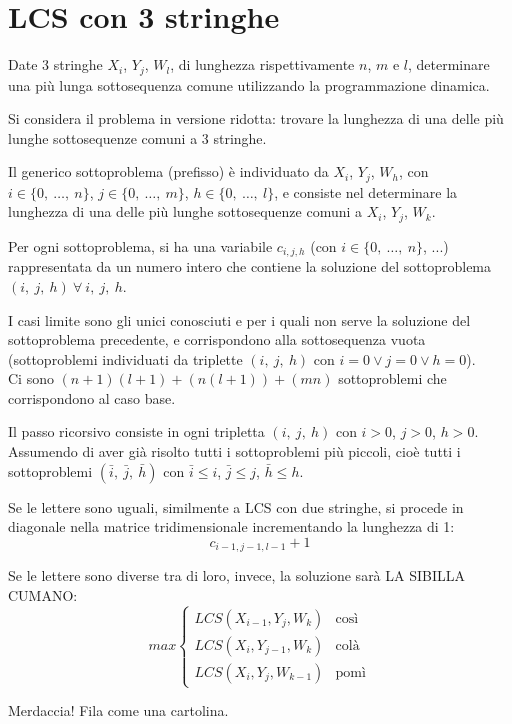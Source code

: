\section{LCS con 3 stringhe}
Date 3 stringhe $X_i$, $Y_j$, $W_l$, di lunghezza rispettivamente $n$, $m$ e $l$, determinare una più lunga sottosequenza comune utilizzando la programmazione dinamica.

Si considera il problema in versione ridotta: trovare la lunghezza di una delle più lunghe sottosequenze comuni a 3 stringhe.

Il generico sottoproblema (prefisso) è individuato da $X_i$, $Y_j$, $W_h$, con $i \in \{0,\ \dots,\ n\}$, $j \in \{0,\ \dots,\ m\}$, $h \in \{0,\ \dots,\ l\}$, e consiste nel determinare la lunghezza di una delle più lunghe sottosequenze comuni a $X_i$, $Y_j$, $W_k$.

Per ogni sottoproblema, si ha una variabile $c_{i, j, h}$ (con $i \in \{0,\ \dots,\ n\}$, ...) rappresentata da un numero intero che contiene la soluzione del sottoproblema $(i,\ j,\ h)\ \forall\ i,\ j,\ h$.

I casi limite sono gli unici conosciuti e per i quali non serve la soluzione del sottoproblema precedente, e corrispondono alla sottosequenza vuota (sottoproblemi individuati da triplette $(i,\ j,\ h)$ con $i = 0 \lor j = 0 \lor h = 0$). \\
Ci sono $(n+1)(l+1)+(n(l+1))+(mn)$ sottoproblemi che corrispondono al caso base.

Il passo ricorsivo consiste in ogni tripletta $(i,\ j,\ h)$ con $i > 0$, $j > 0$, $h > 0$. Assumendo di aver già risolto tutti i sottoproblemi più piccoli, cioè tutti i sottoproblemi $(\bar{i},\ \bar{j},\ \bar{h})$ con $\bar{i} \leq i$, $\bar{j} \leq j$, $\bar{h} \leq h$.

Se le lettere sono uguali, similmente a LCS con due stringhe, si procede in diagonale nella matrice tridimensionale incrementando la lunghezza di 1:
$$c_{i-1, j-1, l-1} + 1 $$

Se le lettere sono diverse tra di loro, invece, la soluzione sarà LA SIBILLA CUMANO:
$$max\begin{cases}
LCS(X_{i-1}, Y_j, W_k)  & \text{così} \\
LCS(X_i, Y_{j-1}, W_k) & \text{colà} \\
LCS(X_i, Y_j, W_{k-1}) & \text{pomì}
\end{cases}$$

Merdaccia! Fila come una cartolina.

